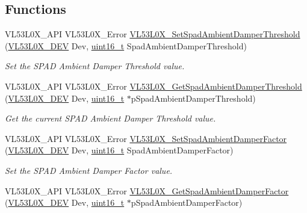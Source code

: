 \subsection*{Functions}
\begin{DoxyCompactItemize}
\item 
V\+L53\+L0\+X\+\_\+\+A\+PI V\+L53\+L0\+X\+\_\+\+Error \hyperlink{group__VL53L0X__SPADfunctions__group_ga989a7fd1772142cc2d4d63d6f3d0fb7e}{V\+L53\+L0\+X\+\_\+\+Set\+Spad\+Ambient\+Damper\+Threshold} (\hyperlink{group__VL53L0X__platform__group_ga2d6405308b1dd524b462f1b8fb97d167}{V\+L53\+L0\+X\+\_\+\+D\+EV} Dev, \hyperlink{vl53l0x__types_8h_a273cf69d639a59973b6019625df33e30}{uint16\+\_\+t} Spad\+Ambient\+Damper\+Threshold)
\begin{DoxyCompactList}\small\item\em Set the S\+P\+AD Ambient Damper Threshold value. \end{DoxyCompactList}\item 
V\+L53\+L0\+X\+\_\+\+A\+PI V\+L53\+L0\+X\+\_\+\+Error \hyperlink{group__VL53L0X__SPADfunctions__group_gab4242560466b011b4932f0df18b5ad1a}{V\+L53\+L0\+X\+\_\+\+Get\+Spad\+Ambient\+Damper\+Threshold} (\hyperlink{group__VL53L0X__platform__group_ga2d6405308b1dd524b462f1b8fb97d167}{V\+L53\+L0\+X\+\_\+\+D\+EV} Dev, \hyperlink{vl53l0x__types_8h_a273cf69d639a59973b6019625df33e30}{uint16\+\_\+t} $\ast$p\+Spad\+Ambient\+Damper\+Threshold)
\begin{DoxyCompactList}\small\item\em Get the current S\+P\+AD Ambient Damper Threshold value. \end{DoxyCompactList}\item 
V\+L53\+L0\+X\+\_\+\+A\+PI V\+L53\+L0\+X\+\_\+\+Error \hyperlink{group__VL53L0X__SPADfunctions__group_ga8b17c5364d68ff87f3f99a8292db59d7}{V\+L53\+L0\+X\+\_\+\+Set\+Spad\+Ambient\+Damper\+Factor} (\hyperlink{group__VL53L0X__platform__group_ga2d6405308b1dd524b462f1b8fb97d167}{V\+L53\+L0\+X\+\_\+\+D\+EV} Dev, \hyperlink{vl53l0x__types_8h_a273cf69d639a59973b6019625df33e30}{uint16\+\_\+t} Spad\+Ambient\+Damper\+Factor)
\begin{DoxyCompactList}\small\item\em Set the S\+P\+AD Ambient Damper Factor value. \end{DoxyCompactList}\item 
V\+L53\+L0\+X\+\_\+\+A\+PI V\+L53\+L0\+X\+\_\+\+Error \hyperlink{group__VL53L0X__SPADfunctions__group_gaf43dba72f3295ec5d0334d5712d122ce}{V\+L53\+L0\+X\+\_\+\+Get\+Spad\+Ambient\+Damper\+Factor} (\hyperlink{group__VL53L0X__platform__group_ga2d6405308b1dd524b462f1b8fb97d167}{V\+L53\+L0\+X\+\_\+\+D\+EV} Dev, \hyperlink{vl53l0x__types_8h_a273cf69d639a59973b6019625df33e30}{uint16\+\_\+t} $\ast$p\+Spad\+Ambient\+Damper\+Factor)

\end{DoxyCompactItemize}
